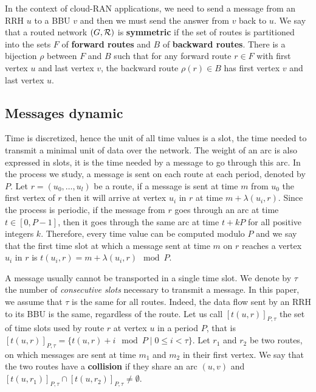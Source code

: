 \documentclass[a4paper,10pt]{IEEEtran}
\begin{document}
   In the context of cloud-RAN applications, we need to send a message from an RRH $u$ to a BBU $v$ and then 
      we must send the answer from $v$ back to $u$. We say that a routed network $(G, {\cal R})$ is \textbf{symmetric} if the set of routes is partitioned into the sets $F$ of \textbf{forward routes} and $B$ of \textbf{backward routes}. There is a bijection $\rho$ between $F$ and $B$ such that for any forward route $r \in F$ with first vertex $u$ and last vertex $v$, the backward route $\rho(r) \in B$ has first vertex $v$ and last vertex $u$. 
       

   \subsection{Messages dynamic}
      Time is discretized, hence the unit of all time values is a slot, the time needed to transmit a minimal unit of data over the network. The weight of an arc is also expressed in slots, it is the time needed by a message to go through this arc.
        In the process we study, a message is sent on each route at each period, denoted by $P$.
      Let $r=(u_0,\dots,u_l)$ be a route, if a message is sent at time $m$ from $u_0$ the first vertex of $r$ then it will arrive at vertex $u_i$ in $r$ at time $m + \lambda(u_i,r)$. Since the process is periodic, if the message from $r$ goes through an arc at time $t\in [0,P-1]$, 
      then it goes through the same arc at time $t+kP$ for all positive integers $k$. Therefore, every time value can be computed modulo $P$ and we say that the first time slot at which a message sent at time $m$ on $r$ reaches a vertex $u_i$ in $r$ is $t(u_i,r) = m + \lambda(u_i,r)\mod P$. 
      
      A message usually cannot be transported in a single time slot. We denote by $\tau$ the number 
      of \emph{consecutive slots} necessary to transmit a message. In this paper, we assume that $\tau$ is the same for all routes. Indeed, the data flow sent by an RRH to its BBU is the same, regardless of the route. Let us call $[t(u,r)]_{P,\tau}$ the set of time slots used by route $r$ at vertex $u$ in a period $P$, that is $[t(u,r)]_{P,\tau} = \{t(u,r) + i \mod P \mid 0 \leq i < \tau \}$. 
      Let $r_1$ and $r_2$ be two routes, on which messages are sent at time $m_1$ and $m_2$ in their first vertex.
      We say that the two routes have a {\bf collision} if they share an arc $(u,v)$ and $[t(u,r_{1})]_{P,\tau} \cap [t(u,r_{2})]_{P,\tau} \neq \emptyset$.
      
\end{document}

